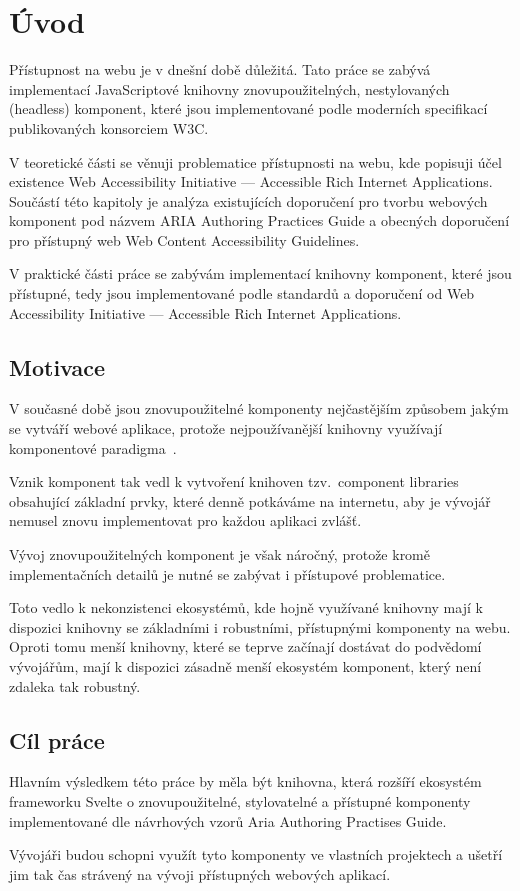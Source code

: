 \chapter{Úvod}

Přístupnost na webu je v dnešní době důležitá. Tato práce se zabývá implementací JavaScriptové knihovny
znovupoužitelných, nestylovaných (headless) komponent, které jsou implementované podle moderních specifikací publikovaných konsorciem W3C.

V teoretické části se věnuji problematice přístupnosti na webu, kde popisuji účel existence
Web Accessibility Initiative --- Accessible Rich Internet Applications.
Součástí této kapitoly je analýza existujících doporučení pro tvorbu webových
komponent pod názvem ARIA Authoring Practices Guide a
obecných doporučení pro přístupný web Web Content Accessibility Guidelines.

V praktické části práce se zabývám implementací knihovny komponent,
které jsou přístupné, tedy jsou implementované podle standardů a doporučení od Web Accessibility Initiative --- Accessible Rich Internet Applications.

\section{Motivace}

V současné době jsou znovupoužitelné komponenty nejčastějším způsobem jakým se vytváří webové aplikace, protože nejpoužívanější knihovny využívají komponentové paradigma~\cite{react,vue,solid,svelte}.

Vznik komponent tak vedl k vytvoření knihoven tzv.\ component libraries obsahující základní prvky, které denně potkáváme na internetu, aby je vývojář nemusel znovu implementovat pro každou aplikaci zvlášť.

Vývoj znovupoužitelných komponent je však náročný, protože kromě implementačních detailů je nutné se zabývat i přístupové problematice.

Toto vedlo k nekonzistenci ekosystémů, kde hojně využívané knihovny mají k dispozici knihovny se základními i robustními, přístupnými komponenty na webu. Oproti tomu menší knihovny, které se teprve začínají dostávat do podvědomí vývojářům, mají k dispozici zásadně menší ekosystém komponent, který není zdaleka tak robustný.

\section{Cíl práce}

Hlavním výsledkem této práce by měla být knihovna, která rozšíří ekosystém frameworku Svelte o znovupoužitelné, stylovatelné a přístupné komponenty implementované dle návrhových vzorů Aria Authoring Practises Guide.

Vývojáři budou schopni využít tyto komponenty ve vlastních projektech a ušetří jim tak čas strávený na vývoji přístupných webových aplikací.
